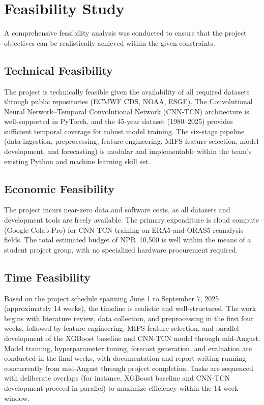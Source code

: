 \section{Feasibility Study}

A comprehensive feasibility analysis was conducted to ensure that the project objectives can be realistically achieved within the given constraints.

\subsection{Technical Feasibility}

The project is technically feasible given the availability of all required datasets through public repositories (ECMWF CDS, NOAA, ESGF). The Convolutional Neural Network--Temporal Convolutional Network (CNN-TCN) architecture is well-supported in PyTorch, and the 45-year dataset (1980--2025) provides sufficient temporal coverage for robust model training. The six-stage pipeline (data ingestion, preprocessing, feature engineering, MIFS feature selection, model development, and forecasting) is modular and implementable within the team's existing Python and machine learning skill set.

\subsection{Economic Feasibility}

The project incurs near-zero data and software costs, as all datasets and development tools are freely available. The primary expenditure is cloud compute (Google Colab Pro) for CNN-TCN training on ERA5 and ORAS5 reanalysis fields. The total estimated budget of NPR~10,500 is well within the means of a student project group, with no specialized hardware procurement required.

\subsection{Time Feasibility}

Based on the project schedule spanning June 1 to September 7, 2025 (approximately 14 weeks), the timeline is realistic and well-structured. The work begins with literature review, data collection, and preprocessing in the first four weeks, followed by feature engineering, MIFS feature selection, and parallel development of the XGBoost baseline and CNN-TCN model through mid-August. Model training, hyperparameter tuning, forecast generation, and evaluation are conducted in the final weeks, with documentation and report writing running concurrently from mid-August through project completion. Tasks are sequenced with deliberate overlaps (for instance, XGBoost baseline and CNN-TCN development proceed in parallel) to maximize efficiency within the 14-week window.

